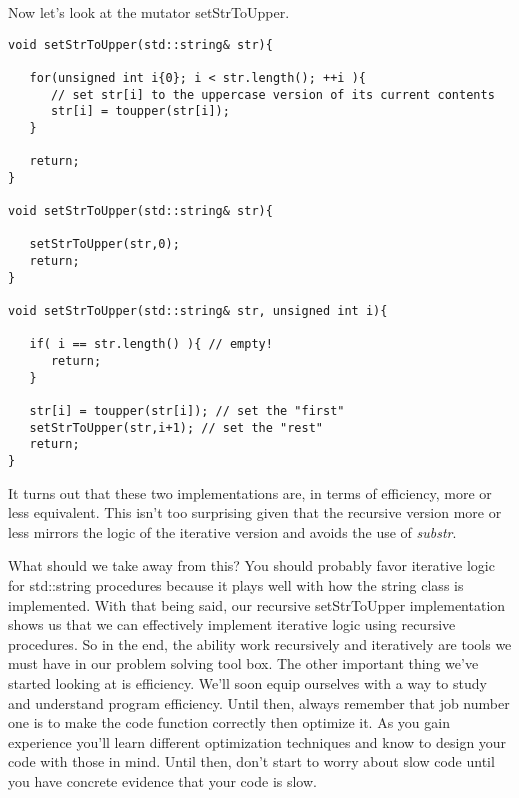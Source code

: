 \documentclass[]{tufte-handout}
\begin{document}
Now let's look at the mutator setStrToUpper.
\begin{verbatim}
void setStrToUpper(std::string& str){
   
   for(unsigned int i{0}; i < str.length(); ++i ){
	  // set str[i] to the uppercase version of its current contents
      str[i] = toupper(str[i]);
   }
   
   return;
}

void setStrToUpper(std::string& str){

   setStrToUpper(str,0);
   return;
}

void setStrToUpper(std::string& str, unsigned int i){
   
   if( i == str.length() ){ // empty!
      return;
   }
   
   str[i] = toupper(str[i]); // set the "first"
   setStrToUpper(str,i+1); // set the "rest"
   return;
}
\end{verbatim}
It turns out that these two implementations are, in terms of efficiency, more or less equivalent. This isn't too surprising given that the recursive version more or less mirrors the logic of the iterative version and avoids the use of \textit{substr}. 

What should we take away from this? You should probably favor iterative logic for std::string procedures because it plays well with how the string class is implemented. With that being said, our recursive setStrToUpper implementation shows us that we can effectively implement iterative logic using recursive procedures. So in the end, the ability work recursively and iteratively are tools we must have in our problem solving tool box.  The other important thing we've started looking at is efficiency.  We'll soon equip ourselves with a way to study and understand program efficiency.  Until then, always remember that job number one is to make the code function correctly then optimize it. As you gain experience you'll learn different optimization techniques and know to design your code with those in mind. Until then, don't start to worry about slow code until you have concrete evidence that your code is slow. 
\end{document}
